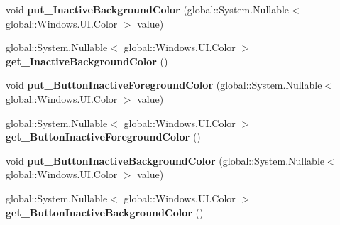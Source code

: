 \begin{DoxyCompactItemize}
\mbox{\label{class_windows_1_1_u_i_1_1_view_management_1_1_application_view_title_bar_aa912163f22981533bcaf244d367a36e0}} 
void {\bfseries put\+\_\+\+Inactive\+Background\+Color} (global\+::\+System.\+Nullable$<$ global\+::\+Windows.\+U\+I.\+Color $>$ value)
\item 
\mbox{\label{class_windows_1_1_u_i_1_1_view_management_1_1_application_view_title_bar_aab1e5ef6e2bc37796640ab4cd4c4d182}} 
global\+::\+System.\+Nullable$<$ global\+::\+Windows.\+U\+I.\+Color $>$ {\bfseries get\+\_\+\+Inactive\+Background\+Color} ()
\item 
\mbox{\label{class_windows_1_1_u_i_1_1_view_management_1_1_application_view_title_bar_a24fc97928a847870e480f914ee47dfb5}} 
void {\bfseries put\+\_\+\+Button\+Inactive\+Foreground\+Color} (global\+::\+System.\+Nullable$<$ global\+::\+Windows.\+U\+I.\+Color $>$ value)
\item 
\mbox{\label{class_windows_1_1_u_i_1_1_view_management_1_1_application_view_title_bar_a4921101b9d4e1bf1aaadc876b4855657}} 
global\+::\+System.\+Nullable$<$ global\+::\+Windows.\+U\+I.\+Color $>$ {\bfseries get\+\_\+\+Button\+Inactive\+Foreground\+Color} ()
\item 
\mbox{\label{class_windows_1_1_u_i_1_1_view_management_1_1_application_view_title_bar_a61074bacb31ca090b2114fcd7d61167b}} 
void {\bfseries put\+\_\+\+Button\+Inactive\+Background\+Color} (global\+::\+System.\+Nullable$<$ global\+::\+Windows.\+U\+I.\+Color $>$ value)
\item 
\mbox{\label{class_windows_1_1_u_i_1_1_view_management_1_1_application_view_title_bar_abafef7d0cebc7bdecdff70332dd6c825}} 
global\+::\+System.\+Nullable$<$ global\+::\+Windows.\+U\+I.\+Color $>$ {\bfseries get\+\_\+\+Button\+Inactive\+Background\+Color} ()
\item 
\mbox{\label{class_windows_1_1_u_i_1_1_view_management_1_1_application_view_title_bar_a4b9382135e40d19c25f0633e1eea3e67}} 

\end{DoxyCompactItemize}
